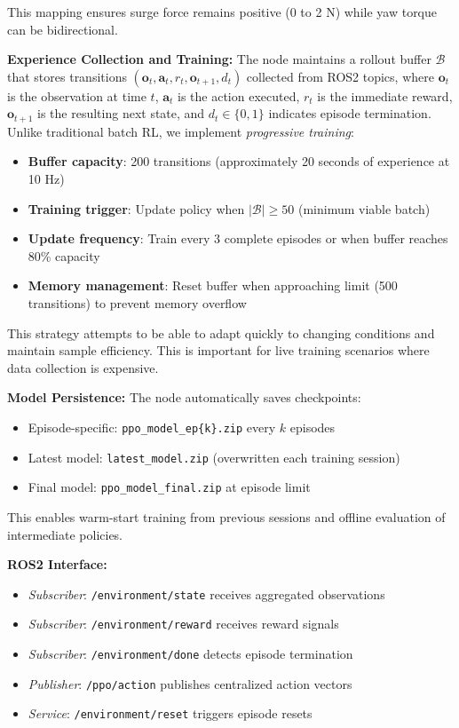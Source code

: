 \documentclass[preprint,3p]{elsarticle}
\begin{document}
This mapping ensures surge force remains positive (0 to 2 N) while yaw torque can be bidirectional.

\vspace{1em}

\textbf{Experience Collection and Training:} The node maintains a rollout buffer $\mathcal{B}$ that stores transitions $(\mathbf{o}_t, \mathbf{a}_t, r_t, \mathbf{o}_{t+1}, d_t)$ collected from ROS2 topics, where $\mathbf{o}_t$ is the observation at time $t$, $\mathbf{a}_t$ is the action executed, $r_t$ is the immediate reward, $\mathbf{o}_{t+1}$ is the resulting next state, and $d_t \in \{0,1\}$ indicates episode termination. Unlike traditional batch RL, we implement \textit{progressive training}:

\begin{itemize}
    \item \textbf{Buffer capacity}: 200 transitions (approximately 20 seconds of experience at 10 Hz)
    \item \textbf{Training trigger}: Update policy when $|\mathcal{B}| \geq 50$ (minimum viable batch)
    \item \textbf{Update frequency}: Train every 3 complete episodes or when buffer reaches 80\% capacity
    \item \textbf{Memory management}: Reset buffer when approaching limit (500 transitions) to prevent memory overflow
\end{itemize}

This strategy attempts to be able to adapt quickly to changing conditions and maintain sample efficiency. This is important for live training scenarios where data collection is expensive.

\vspace{1em}

\textbf{Model Persistence:} The node automatically saves checkpoints:
\begin{itemize}
    \item Episode-specific: \texttt{ppo\_model\_ep\{k\}.zip} every $k$ episodes
    \item Latest model: \texttt{latest\_model.zip} (overwritten each training session)
    \item Final model: \texttt{ppo\_model\_final.zip} at episode limit
\end{itemize}

This enables warm-start training from previous sessions and offline evaluation of intermediate policies.

\textbf{ROS2 Interface:}
\begin{itemize}
    \item \textit{Subscriber}: \texttt{/environment/state} receives aggregated observations
    \item \textit{Subscriber}: \texttt{/environment/reward} receives reward signals
    \item \textit{Subscriber}: \texttt{/environment/done} detects episode termination
    \item \textit{Publisher}: \texttt{/ppo/action} publishes centralized action vectors
    \item \textit{Service}: \texttt{/environment/reset} triggers episode resets
\end{itemize}
\end{document}
